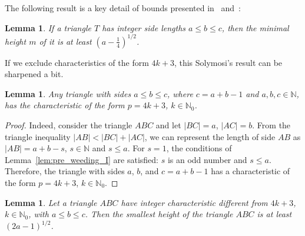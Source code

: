 \documentclass[a4paper,14pt]{article} %
\theoremstyle{plain}
\newtheorem{lemma}[theorem]{Lemma}
\theoremstyle{definition}
\begin{document}
The following result is a key detail of bounds presented
in~\cite{solymosi2003note} and~\cite{my-semi-general-5-4-bound-2019}:

\begin{lemma}
	\cite[Observation 1]{solymosi2003note}
	If a triangle $T$ has integer side lengths $a \leq b \leq c$,
	then the minimal height $m$ of it is at least $\left(a - \frac{1}{4}\right)^{1/2}$.
\end{lemma}

If we exclude characteristics of the form $4k+3$, this Solymosi's result can be sharpened a bit.

\begin{lemma}
	\label{lem:triangle_4k_plus_3}
	Any triangle with sides $a \leq b \leq c$, where $c=a+b-1$ and $a, b, c \in \mathbb{N}$,
	has the characteristic of the form $p=4k+3$, $k\in \mathbb{N}_0$.
\end{lemma}

\begin{proof}
	Indeed, consider the triangle $ABC$ and let $|BC|=a$, $|AC|=b$.
	From the triangle inequality $|AB| < |BC|+|AC|$,
	we can represent the length of side $AB$ as $|AB|=a+b-s$, $s \in \mathbb{N}$ and $s \leq a$.
	For $s=1$, the conditions of Lemma~\ref{lem:pre_weeding_I} are satisfied: $s$ is an odd number and $s \leq a$.
	Therefore, the triangle with sides $a$, $b$, and $c=a+b-1$
	has a characteristic of the form $p=4k+3$, $k\in \mathbb{N}_0$.
\end{proof}


\begin{lemma}
	\label{lem:triangle_height_our}
	Let a triangle $ABC$ have integer characteristic different from $4k+3$, $k\in \mathbb{N}_0$, with $a\leq b\leq c$. Then the smallest height of the triangle $ABC$ is at least $(2a-1)^{1/2}$.
\end{lemma}
\end{document}
